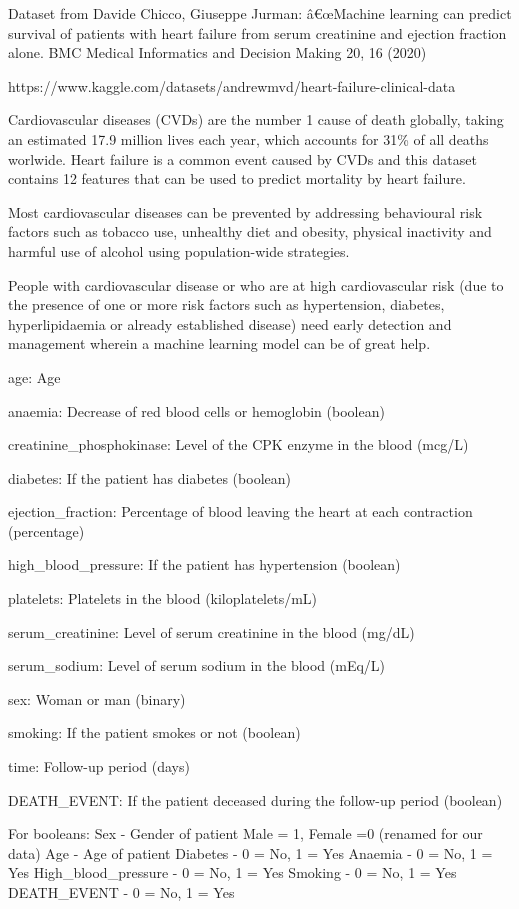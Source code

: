 \documentclass[
  letterpaper,
]{krantz}
\begin{document}
Dataset from Davide Chicco, Giuseppe Jurman: â€œMachine learning can
predict survival of patients with heart failure from serum creatinine
and ejection fraction alone. BMC Medical Informatics and Decision Making
20, 16 (2020)

https://www.kaggle.com/datasets/andrewmvd/heart-failure-clinical-data

Cardiovascular diseases (CVDs) are the number 1 cause of death globally,
taking an estimated 17.9 million lives each year, which accounts for
31\% of all deaths worlwide. Heart failure is a common event caused by
CVDs and this dataset contains 12 features that can be used to predict
mortality by heart failure.

Most cardiovascular diseases can be prevented by addressing behavioural
risk factors such as tobacco use, unhealthy diet and obesity, physical
inactivity and harmful use of alcohol using population-wide strategies.

People with cardiovascular disease or who are at high cardiovascular
risk (due to the presence of one or more risk factors such as
hypertension, diabetes, hyperlipidaemia or already established disease)
need early detection and management wherein a machine learning model can
be of great help.

age: Age

anaemia: Decrease of red blood cells or hemoglobin (boolean)

creatinine\_phosphokinase: Level of the CPK enzyme in the blood (mcg/L)

diabetes: If the patient has diabetes (boolean)

ejection\_fraction: Percentage of blood leaving the heart at each
contraction (percentage)

high\_blood\_pressure: If the patient has hypertension (boolean)

platelets: Platelets in the blood (kiloplatelets/mL)

serum\_creatinine: Level of serum creatinine in the blood (mg/dL)

serum\_sodium: Level of serum sodium in the blood (mEq/L)

sex: Woman or man (binary)

smoking: If the patient smokes or not (boolean)

time: Follow-up period (days)

DEATH\_EVENT: If the patient deceased during the follow-up period
(boolean)

For booleans: Sex - Gender of patient Male = 1, Female =0 (renamed for
our data) Age - Age of patient Diabetes - 0 = No, 1 = Yes Anaemia - 0 =
No, 1 = Yes High\_blood\_pressure - 0 = No, 1 = Yes Smoking - 0 = No, 1
= Yes DEATH\_EVENT - 0 = No, 1 = Yes
\end{document}
